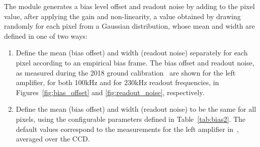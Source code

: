 \documentclass[11pt]{article}      %
\begin{document}
The module generates a bias level offset and readout noise by adding to the pixel value, after applying the gain and non-linearity, a value obtained by drawing randomly for each pixel from a Gaussian distribution, whose mean and width are defined in one of two ways:

\begin{enumerate}
\item Define the mean (bias offset) and width (readout noise) separately for each pixel according to an empirical bias frame. The bias offset and readout noise, as measured during the 2018 ground calibration~\cite{payload_calibration} are shown for the left amplifier, for both 100kHz and for 230kHz readout frequencies, in Figures~\ref{fig:bias_offset} and \ref{fig:readout_noise}, respectively.
\item Define the mean (bias offset) and width (readout noise) to be the same for all pixels, using the configurable parameters defined in Table~\ref{tab:bias2}. The default values correspond to the measurements for the left amplifier in~\cite{payload_calibration}, averaged over the CCD.
\end{enumerate}
\end{document}
